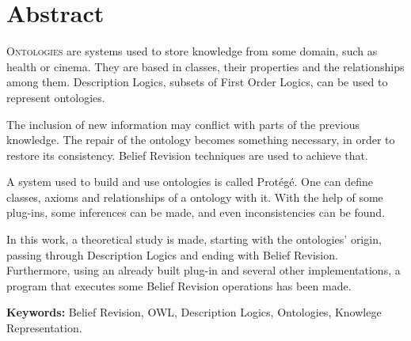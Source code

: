 \chapter*{Abstract}

\lettrine{O}{ntologies} are systems used to store knowledge from some domain, such as health or cinema. They are based in classes, their properties and the relationships among them. Description Logics, subsets of First Order Logics, can be used to represent ontologies.

The inclusion of new information may conflict with parts of the previous knowledge. The repair of the ontology becomes something necessary, in order to restore its consistency. Belief Revision techniques are used to achieve that.

A system used to build and use ontologies is called Protégé. One can define classes, axioms and relationships of a ontology with it. With the help of some plug-ins, some inferences can be made, and even inconsistencies can be found.

In this work, a theoretical study is made, starting with the ontologies' origin, passing through Description Logics and ending with Belief Revision. Furthermore, using an already built plug-in and several other implementations, a program that executes some Belief Revision operations has been made.

\noindent \textbf{Keywords:} Belief Revision, OWL, Description Logics, Ontologies, Knowlege Representation.